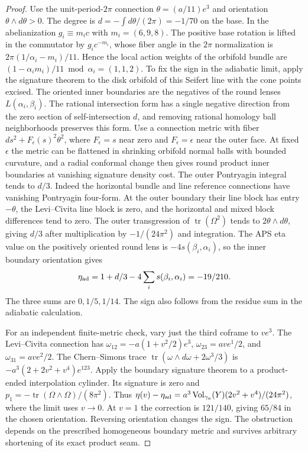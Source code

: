 \begin{proof}
Use the unit-period-\(2\pi\) connection
\(\theta=(a/11)e^3\) and orientation \(\theta\wedge d\theta>0\).
The degree is \(d=-\int d\theta/(2\pi)=-1/70\) on the base.
In the abelianization \(g_i\equiv m_i c\) with
\(m_i=(6,9,8)\). The positive base rotation is lifted in the
commutator by \(g_i c^{-m_i}\), whose fiber angle in the
\(2\pi\) normalization is \(2\pi(1/\alpha_i-m_i)/11\).
Hence the local action weights of the orbifold bundle are
\((1-\alpha_i m_i)/11\bmod\alpha_i=(1,1,2)\).
To fix the sign in the adiabatic limit, apply the signature
theorem to the disk orbifold of this Seifert line with the
cone points excised. The oriented inner boundaries are the
negatives of the round lenses \(L(\alpha_i,\beta_i)\).
The rational intersection form has a single negative direction
from the zero section of self-intersection \(d\), and removing
rational homology ball neighborhoods preserves this form.
Use a connection metric with fiber
\(ds^2+F_\epsilon(s)^2\theta^2\), where \(F_\epsilon=s\)
near zero and \(F_\epsilon=\epsilon\) near the outer face.
At fixed \(\epsilon\) the metric can be flattened in shrinking
orbifold normal balls with bounded curvature, and a radial
conformal change then gives round product inner boundaries at
vanishing signature density cost. The outer Pontryagin
integral tends to \(d/3\). Indeed the horizontal bundle and
line reference connections have vanishing Pontryagin four-form.
At the outer boundary their line block has entry \(-\theta\),
the Levi--Civita line block is zero, and the horizontal and
mixed block differences tend to zero. The outer transgression
of \(\operatorname{tr}(\Omega^2)\) tends to
\(2\theta\wedge d\theta\), giving \(d/3\) after multiplication
by \(-1/(24\pi^2)\) and integration.
The APS eta value on the positively oriented round lens is
\(-4s(\beta_i,\alpha_i)\), so the inner boundary orientation
gives
\[
 \eta_{\rm ad}=1+d/3-4\sum_i s(\beta_i,\alpha_i)
              =-19/210.
\]
The three sums are \(0,1/5,1/14\). The sign also follows from
the residue sum in the adiabatic calculation.
\cite[Theorem (4.14)]{APS1975SpectralI}
\cite[Proposition (2.12)]{APS1975SpectralII}
\cite[equations (75)--(77)]{BiquardHerzlichRumin2007Diabatic}

For an independent finite-metric check, vary just the
third coframe to \(v e^3\). The Levi--Civita connection has
\(\omega_{12}=-a(1+v^2/2)e^3\),
\(\omega_{23}=av e^1/2\), and \(\omega_{31}=av e^2/2\).
The Chern--Simons trace
\(\operatorname{tr}(\omega\wedge d\omega+2\omega^3/3)\)
is \(-a^3(2+2v^2+v^4)e^{123}\).
Apply the boundary signature theorem to a product-ended
interpolation cylinder. Its signature is zero and
\(p_1=-\operatorname{tr}(\Omega\wedge\Omega)/(8\pi^2)\).
Thus \(\eta(v)-\eta_{\rm ad}=
 a^3\operatorname{Vol}_{\gamma_a}(Y)(2v^2+v^4)/(24\pi^2)\),
where the limit uses \(v\to0\).
At \(v=1\) the correction is \(121/140\), giving \(65/84\)
in the chosen orientation. Reversing orientation changes the
sign. The obstruction depends on the prescribed homogeneous
boundary metric and survives arbitrary shortening of its
exact product seam.
\end{proof}

